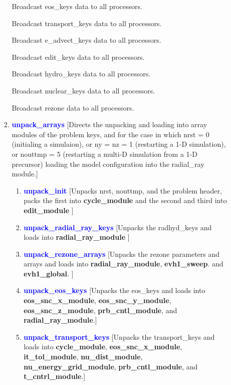 \documentclass[11pt,doublespace]{article}
\begin{document}
\begin{itemize}
\begin{enumerate}
\begin{enumerate}
  Broadcast eos\_keys data to all processors.

  Broadcast transport\_keys data to all processors.

  Broadcast e\_advect\_keys data to all processors.

  Broadcast edit\_keys data to all processors.

  Broadcast hydro\_keys data to all processors.

  Broadcast nuclear\_keys data to all processors.

  Broadcast rezone data to all processors.
  
  \item \textcolor{blue}{ {\bf unpack\_arrays} }
  [Directs the unpacking and loading into array modules of the problem keys, and for the case in which nrst = 0 (initialing a simulaion), or  ny = nz = 1 (restarting a 1-D simulation), or nouttmp = 5 (restarting a multi-D simulation from a 1-D precursor) loading the model configuration into the radial\_ray module.]

\begin{enumerate}

  \item \textcolor{blue}{ {\bf unpack\_init} }
  [Unpacks nrst, nouttmp, and the problem header, packs the first into {\bf cycle\_module} and the second and third into {\bf edit\_module} ]

  \item \textcolor{blue}{ {\bf unpack\_radial\_ray\_keys} }
  [Unpacks the radhyd\_keys and loads into {\bf radial\_ray\_module} ]

  \item \textcolor{blue}{ {\bf unpack\_rezone\_arrays} }
  [Unpacks the rezone parameters and arrays and loads into {\bf radial\_ray\_module}, {\bf evh1\_sweep}. and {\bf evh1\_global}. ]

  \item \textcolor{blue}{ {\bf unpack\_eos\_keys} }
  [Unpacks the eos\_keys and loads into {\bf eos\_snc\_x\_module}, {\bf eos\_snc\_y\_module}, {\bf eos\_snc\_z\_module}, {\bf prb\_cntl\_module}, and {\bf radial\_ray\_module}.]

  \item \textcolor{blue}{ {\bf unpack\_transport\_keys} }
  [Unpacks the transport\_keys and loads into {\bf cycle\_module}, {\bf eos\_snc\_x\_module}, {\bf it\_tol\_module}, {\bf nu\_dist\_module}, {\bf nu\_energy\_grid\_module}, {\bf prb\_cntl\_module}, and {\bf t\_cntrl\_module}.]


\end{enumerate}
\end{enumerate}
\end{enumerate}
\end{itemize}
\end{document}
